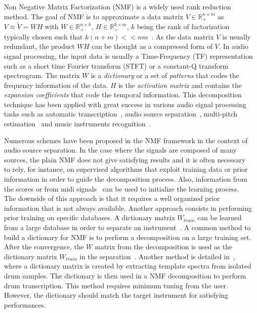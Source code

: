 Non Negative Matrix Factorization (NMF) is a widely used rank reduction method. The goal of NMF is to approximate a data matrix $V \in \mathbb{R}_{+}^{n \times m} $ as $V \approx \tilde{V} = WH$ with $W \in \mathbb{R}_{+}^{n \times k}$, $H \in \mathbb{R}_{+}^{k \times m}$, $k$ being the rank of factorization typically chosen such that \mbox{$k(n+m) << nm  $}~\cite{lee99}. As the data matrix $V$ is usually redundant, the product $WH$ can be thought as a compressed form of $V$. In audio signal processing, the input data is usually a Time-Frequency (TF) representation such as a short time Fourier transform (STFT) or a constant-Q transform spectrogram. The matrix $W$ is a {\em dictionary} or a set of {\em patterns} that codes the frequency information of the data. $H$ is the {\em activation matrix} and contains the {\em expansion coefficients} that code the temporal information.
This decomposition technique has been applied with great success in various audio signal processing tasks such as automatic transcription~\cite{EwertM12,NB:ICASSP-07}, audio source separation~\cite{HennequinDAFx2010,JLD:TASLP10}, multi-pitch estimation~\cite{raczynski2007multipitch} and music instruments recognition~\cite{cichocki2009nonnegative}.

Numerous schemes have been proposed in the NMF framework in the context of audio source separation. In the case where the signals are composed of many sources, the plain NMF does not give satisfying results and it is often necessary to rely, for instance, on supervised algorithms that exploit training data or prior information in order to guide the decomposition process. Also, information from the scores or from midi signals~\cite{EwertM12} can be used to initialize the learning process. The downside of this approach is that it requires a well organized prior information that is not always available. Another approach consists in performing prior training on specific databases. A dictionary matrix $W_{train}$ can be learned from a large database in order to separate an instrument~\cite{jaureguiberry2011adaptation,wudrum}. A common method to build a dictionary for NMF is to perform a decomposition on a large training set. After the convergence, the $W$ matrix from the decomposition is used as the dictionary matrix $W_{train}$ in the separation~\cite{jaureguiberry2011adaptation}. Another method is detailed in~\cite{wudrum}, where a dictionary matrix is created by extracting template spectra from isolated drum samples. The dictionary is then used in a NMF decomposition to perform drum transcription. This method requires minimum tuning from the user. However, the dictionary should match the target instrument for satisfying performances. 

